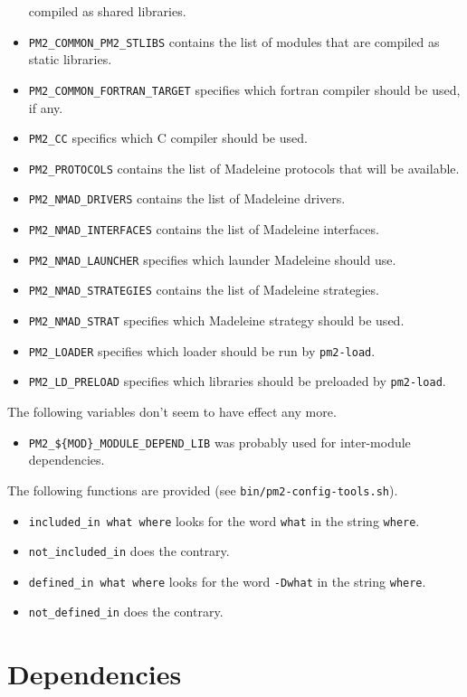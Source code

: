 \documentclass[11pt, a4paper ,twoside]{article}
\begin{document}
\begin{itemize}
compiled as shared libraries.
\item \verb+PM2_COMMON_PM2_STLIBS+ contains the list of modules that are
compiled as static libraries.
\item \verb+PM2_COMMON_FORTRAN_TARGET+ specifies which fortran compiler
should be used, if any.
\item \verb+PM2_CC+ specifics which C compiler should be used.
\item \verb+PM2_PROTOCOLS+ contains the list of Madeleine protocols that
will be available.
\item \verb+PM2_NMAD_DRIVERS+ contains the list of Madeleine drivers.
\item \verb+PM2_NMAD_INTERFACES+ contains the list of Madeleine
interfaces.
\item \verb+PM2_NMAD_LAUNCHER+ specifies which launder Madeleine should
use.
\item \verb+PM2_NMAD_STRATEGIES+ contains the list of Madeleine
strategies.
\item \verb+PM2_NMAD_STRAT+ specifies which Madeleine strategy should
be used.
\item \verb+PM2_LOADER+ specifies which loader should be run by
\verb+pm2-load+.
\item \verb+PM2_LD_PRELOAD+ specifies which libraries should be
preloaded by \verb+pm2-load+.
\end{itemize}

The following variables don't seem to have effect any more.
\begin{itemize}
\item \verb+PM2_${MOD}_MODULE_DEPEND_LIB+ was probably used for
inter-module dependencies.
\end{itemize}

The following functions are provided (see \verb+bin/pm2-config-tools.sh+).
\begin{itemize}
\item \verb+included_in what where+ looks for the word \verb+what+ in
the string \verb+where+.
\item \verb+not_included_in+ does the contrary.
\item \verb+defined_in what where+ looks for the word \verb+-Dwhat+ in
the string \verb+where+.
\item \verb+not_defined_in+ does the contrary.
\end{itemize}


\section{Dependencies}
\end{document}
